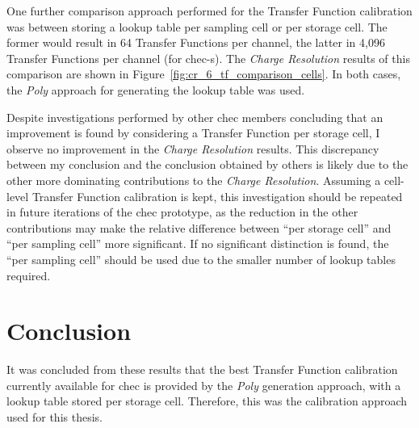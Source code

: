 One further comparison approach performed for the Transfer Function calibration was between storing a lookup table per sampling cell or per storage cell. The former would result in 64 Transfer Functions per channel, the latter in 4,096 Transfer Functions per channel (for \gls{chec-s}). The \textit{Charge Resolution} results of this comparison are shown in Figure~\ref{fig:cr_6_tf_comparison_cells}. In both cases, the \textit{Poly} approach for generating the lookup table was used.

Despite investigations performed by other \gls{chec} members concluding that an improvement is found by considering a Transfer Function per storage cell, I observe no improvement in the \textit{Charge Resolution} results. This discrepancy between my conclusion and the conclusion obtained by others is likely due to the other more dominating contributions to the \textit{Charge Resolution}. Assuming a cell-level Transfer Function calibration is kept, this investigation should be repeated in future iterations of the \gls{chec} prototype, as the reduction in the other contributions may make the relative difference between ``per storage cell'' and ``per sampling cell'' more significant. If no significant distinction is found, the ``per sampling cell'' should be used due to the smaller number of lookup tables required.

\section{Conclusion}

It was concluded from these results that the best Transfer Function calibration currently available for \gls{chec} is provided by the \textit{Poly} generation approach, with a lookup table stored per storage cell. Therefore, this was the calibration approach used for this thesis.